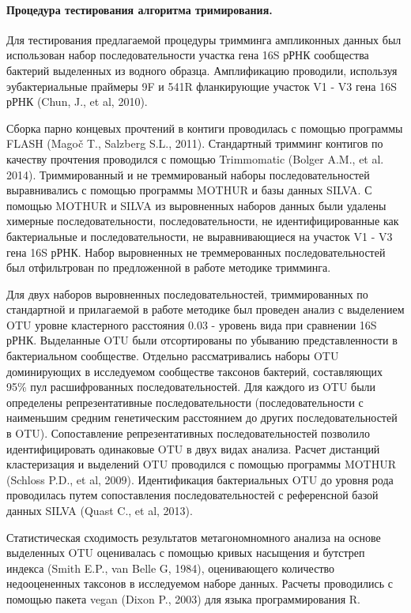 \documentclass[a4paper,12pt,openany,final]{extreport}
\begin{document}
\paragraph{Процедура тестирования алгоритма тримирования.} Для
тестирования предлагаемой процедуры тримминга ампликонных данных был
использован набор последовательности участка гена 16S рРНК сообщества
бактерий выделенных из водного образца. Амплификацию проводили,
используя эубактериальные праймеры 9F и 541R фланкирующие участок V1 -
V3 гена 16S рРНК (Chun, J., et al, 2010).

Сборка парно концевых прочтений в контиги проводилась с помощью
программы FLASH (Magoč T., Salzberg S.L., 2011). Стандартный тримминг
контигов по качеству прочтения проводился с помощью Trimmomatic (Bolger
A.M., et al. 2014). Триммированный и не треммированый наборы
последовательностей выравнивались с помощью программы MOTHUR и базы
данных SILVA. С помощью MOTHUR и SILVA из выровненных наборов данных
были удалены химерные последовательности, последовательности, не
идентифицированные как бактериальные и последовательности, не
выравнивающиеся на участок V1 - V3 гена 16S рРНК. Набор выровненных не
треммерованных последовательностей был отфильтрован по предложенной в
работе методике тримминга.

Для двух наборов выровненных последовательностей, триммированных по
стандартной и прилагаемой в работе методике был проведен анализ с
выделением OTU уровне кластерного расстояния 0.03 - уровень вида при
сравнении 16S рРНК. Выделанные OTU были отсортированы по убыванию
представленности в бактериальном сообществе. Отдельно рассматривались
наборы OTU доминирующих в исследуемом сообществе таксонов бактерий,
составляющих 95\% пул расшифрованных последовательностей. Для каждого из
OTU были определены репрезентативные последовательности
(последовательности с наименьшим средним генетическим расстоянием до
других последовательностей в OTU). Сопоставление репрезентативных
последовательностей позволило идентифицировать одинаковые OTU в двух
видах анализа. Расчет дистанций кластеризация и выделений OTU проводился
с помощью программы MOTHUR (Schloss P.D., et al, 2009). Идентификация
бактериальных OTU до уровня рода проводилась путем сопоставления
последовательностей с референсной базой данных SILVA (Quast C., et al,
2013).

Статистическая сходимость результатов метагономномного анализа на основе
выделенных OTU оценивалась с помощью кривых насыщения и бутстреп индекса
(Smith E.P., van Belle G, 1984), оценивающего количество недооцененных
таксонов в исследуемом наборе данных. Расчеты проводились с помощью
пакета vegan (Dixon P., 2003) для языка программирования R.
\end{document}
